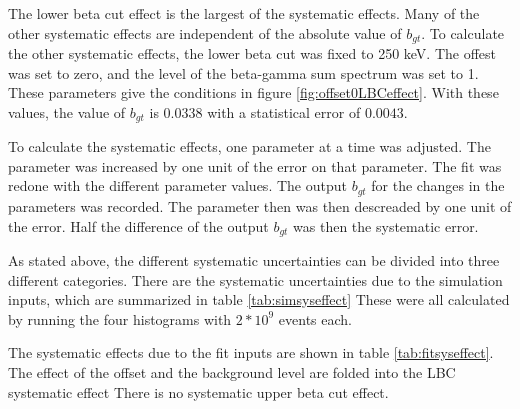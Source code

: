 \documentclass[main.tex]{subfiles}
\begin{document}
The lower beta cut effect is the largest of the systematic effects.
Many of the other systematic effects are independent of the absolute value of $b_{gt}$.
To calculate the other systematic effects, the lower beta cut was fixed to 250 keV.
The offest was set to zero, and the level of the beta-gamma sum spectrum was set to 1.
These parameters give the conditions in figure \ref{fig:offset0LBCeffect}.
With these values, the value of $b_{gt}$ is $0.0338$ with a statistical error of $0.0043$.

To calculate the systematic effects, one parameter at a time was adjusted.
The parameter was increased by one unit of the error on that parameter.
The fit was redone with the different parameter values.
The output $b_{gt}$ for the changes in the parameters was recorded.
The parameter then was then descreaded by one unit of the error.
Half the difference of the output $b_{gt}$ was then the systematic error.

As stated above, the different systematic uncertainties can be divided into three different categories. 
There are the systematic uncertainties due to the simulation inputs, which are summarized in table \ref{tab:simsyseffect}
These were all calculated by running the four histograms with $2 * 10^{9}$ events each.

\begin{table}[!hbt]
	\centering
	\caption{Systematic uncertainties due to simulation inputs}
		\label{tab:simsyseffect}
\end{table}

The systematic effects due to the fit inputs are shown in table \ref{tab:fitsyseffect}.
The effect of the offset and the background level are folded into the LBC systematic effect
There is no systematic upper beta cut effect.

\begin{table}[!hbt]
	\centering
	\caption{Systematic uncertainties due to fit inputs} 
		\label{tab:fitsyseffect}
\end{table}
\end{document}
